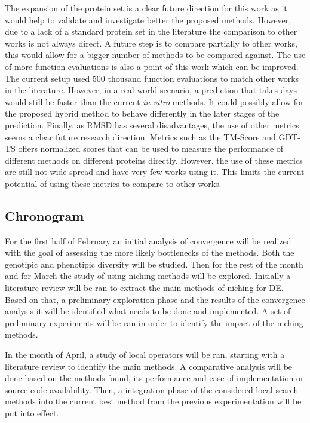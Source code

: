 The expansion of the protein set is a clear future direction for this
work as it would help to validate and investigate better the proposed
methods. However, due to a lack of a standard protein set in the literature the comparison to other works is not always direct.
A future step is to compare partially to other works, this would
allow for a bigger number of methods to be compared against.
The use of more function evaluations is also a point of this work which can be improved. The current setup used 500 thousand function evaluations to match other works in the literature. However, in a real world scenario, a prediction that takes days would still be faster than the current \textit{in vitro} methods. It could possibly allow for the proposed hybrid method to behave differently in the later stages of the prediction.
Finally, as RMSD has several disadvantages, the use of other metrics
seems a clear future research direction. Metrics such as the TM-Score and GDT-TS offers normalized scores that can be used to measure
the performance of different methods on different proteins directly.
However, the use of these metrics are still not wide spread and have
very few works using it. This limits the current potential of using
these metrics to compare to other works. %

\subsection{Chronogram}

For the first half of February an initial analysis of convergence will be realized
with the goal of assessing the more likely bottlenecks of the methods. Both the
genotipic and phenotipic diversity will be studied. Then for the rest of the month
and for March the study of using niching methods will be explored. Initially a 
literature review will be ran to extract the main methods of niching for DE. 
Based on that, a preliminary exploration phase and the results of the convergence
analysis it will be identified what needs to be done and implemented. A set
of preliminary experiments will be ran in order to identify the impact of the 
niching methods. 

In the month of April, a study of local operators will be ran, starting with
a literature review to identify the main methods.
A comparative analysis will be done based on the methods found,
its performance and ease of implementation or source code availability. Then,
a integration phase of the considered local search methods into the current
best method from the previous experimentation will be put into effect.

